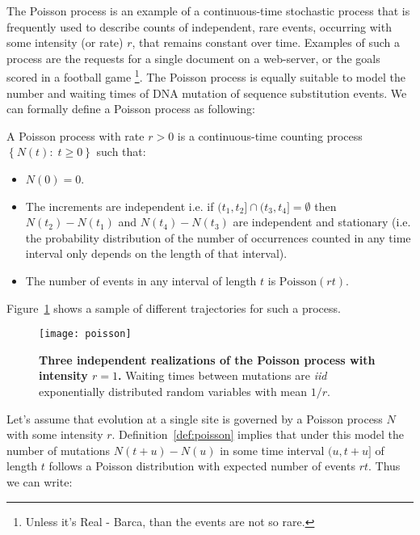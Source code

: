 The Poisson process is an example of a continuous-time stochastic process that is frequently used to describe counts of independent, rare events, occurring with some intensity (or rate) $r$, that remains constant over time. 
Examples of such a process are the requests for a single document on a web-server, or the goals scored in a football game \footnote{Unless it's Real - Barca, than the events are not so rare.}. %
The Poisson process is equally suitable to model the number and waiting times of DNA mutation of sequence substitution events. 
We can formally define a Poisson process as following:

\begin{definition} 
A Poisson process with rate $r>0$ is a continuous-time counting process $\left\{ N(t):\; t\geq0\right\}$ such that:

\begin{itemize}
\item $N(0)=0$.
\item The increments are independent i.e. if $(t_{1},t_{2}]\cap(t_{3},t_{4}]=\emptyset$ then $N(t_2)-N(t_1)$ and $N(t_4)-N(t_3)$ are independent and stationary (i.e. the probability distribution of the number of occurrences counted in any time interval only depends on the length of that interval).
\item The number of events in any interval of length $t$ is $\text{Poisson}(r t)$.
\end{itemize}

\label{def:poisson}
\end{definition}

Figure~\ref{fig:poisson} shows a sample of different trajectories for such a process.

\begin{figure}[h!]
\centering
\texttt{[image: poisson]}
\caption{
{ \footnotesize 
{\bf Three independent realizations of the Poisson process with intensity $r=1$.}
Waiting times between mutations are \emph{iid} exponentially distributed random variables with mean $1/r$.
} %
}
\label{fig:poisson}
\end{figure}

Let's assume that evolution at a single site is governed by a Poisson process $N$ with some intensity $r$.
Definition~\ref{def:poisson} implies that under this model the number of mutations $N(t+u)-N(u)$ in some time interval $(u,t+u]$ of length $t$ follows a Poisson distribution with expected number of events $r t$.
Thus we can write:

